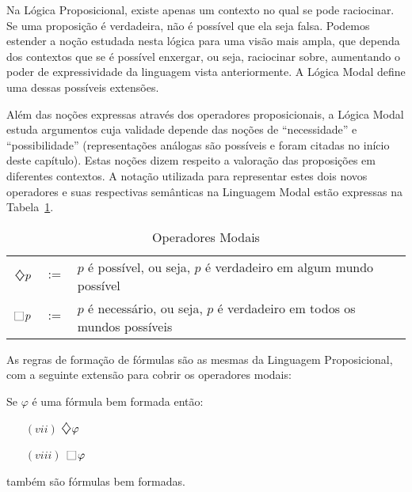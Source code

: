 Na Lógica Proposicional, existe apenas um contexto no qual se pode raciocinar.
Se uma proposição é verdadeira, não é possível que ela seja falsa. Podemos
estender a noção estudada nesta lógica para uma visão mais ampla, que dependa
dos contextos que se é possível enxergar, ou seja, raciocinar sobre, aumentando o
poder de expressividade da linguagem vista anteriormente. A Lógica Modal define
uma dessas possíveis extensões.

Além das noções expressas através dos operadores proposicionais, a Lógica Modal
estuda argumentos cuja validade depende das noções de ``necessidade'' e
``possibilidade'' (representações análogas são possíveis e foram citadas no
início deste capítulo). Estas noções dizem respeito a valoração das proposições
em diferentes contextos. A notação utilizada para representar estes dois novos
operadores e suas respectivas semânticas na Linguagem Modal estão expressas na Tabela~\ref{tab:op_modal}.

\begin{table}[!h]
    \label{tab:op_modal}
    \caption{Operadores Modais}
\begin{center}
    \begin{tabular}{|rcl|}
       \hline 
       $\pos{} p$ & $:=$ & $p$ é possível, ou seja, $p$ é verdadeiro em algum mundo
       possível\\
       $\nec{} p$ & $:=$ & $p$ é necessário, ou seja, $p$ é verdadeiro em todos os mundos
       possíveis\\
       \hline
    \end{tabular}
\end{center}
\end{table}

As regras de formação de fórmulas são as mesmas da Linguagem Proposicional, com
a seguinte extensão para cobrir os operadores modais:

\begin{definition}
   Se $\varphi$ é uma fórmula bem formada então:
   \begin{itemize}
       \item [$(vii)$] $\pos{} \varphi$ 
       \item [$(viii)$] $\nec{} \varphi$ 
   \end{itemize}
   também são fórmulas bem formadas.
\end{definition}
